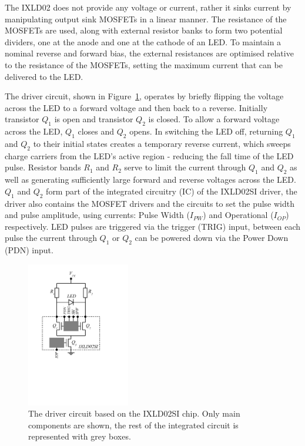 \documentclass[12pt]{report}
\begin{document}
The IXLD02 does not provide any voltage or current, rather it sinks current by manipulating output sink MOSFETs in a linear manner. The resistance of the MOSFETs are used, along with external resistor banks to form two potential dividers, one at the anode and one at the cathode of an LED. To maintain a nominal reverse and forward bias, the external resistances are optimised relative to the resistance of the MOSFETs, setting the maximum current that can be delivered to the LED. 

The driver circuit, shown in Figure~\ref{fig:IXDX02_circuit}, operates by briefly flipping the voltage across the LED to a forward voltage and then back to a reverse. Initially transistor $Q_1$ is open and transistor $Q_2$ is closed. To allow a forward voltage across the LED, $Q_1$ closes and $Q_2$ opens. In switching the LED off, returning $Q_1$ and $Q_2$ to their initial states creates a temporary reverse current, which sweeps charge carriers from the LED's active region - reducing the fall time of the LED pulse. Resistor bands $R_1$ and $R_2$ serve to limit the current through $Q_1$ and $Q_2$ as well as generating sufficiently large forward and reverse voltages across the LED. $Q_1$ and $Q_2$ form part of the integrated circuitry (IC) of the IXLD02SI driver, the driver also contains the MOSFET drivers and the circuits to set the pulse width and pulse amplitude, using currents: Pulse Width ($I_{PW}$) and Operational ($I_{OP}$) respectively. LED pulses are triggered via the trigger (TRIG) input, between each pulse the current through $Q_1$ or $Q_2$ can be powered down via the Power Down (PDN) input. 

\begin{figure}[htbp]
	\begin{center}
		\includegraphics[width=0.4\textwidth]{ixld02_circuit}
		\caption{The driver circuit based on the IXLD02SI chip. Only main components are shown, the rest of the integrated circuit is represented with grey boxes.}
		\label{fig:IXDX02_circuit}
	\end{center}
\end{figure}
\end{document}

